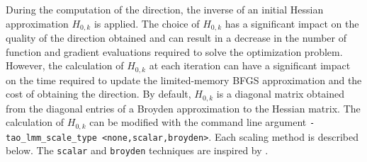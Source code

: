 During the computation of the direction, the inverse of an initial 
Hessian approximation $H_{0,k}$ is applied.  The choice of $H_{0,k}$
has a significant impact on the quality of the direction obtained
and can result in a decrease in the number of function and gradient 
evaluations required to solve the optimization problem.  However,
the calculation of $H_{0,k}$ at each iteration can have a significant 
impact on the time required to update the limited-memory BFGS 
approximation and the cost of obtaining the direction.  By default, 
$H_{0,k}$ is a diagonal matrix obtained from the diagonal entries
of a Broyden approximation to the Hessian matrix.  The calculation
of $H_{0,k}$ can be modified with the command line argument 
{\tt -tao\_lmm\_scale\_type <none,scalar,broyden>}.  Each scaling 
method is described below.  The {\tt scalar} and {\tt broyden} 
techniques are inspired by \cite{Gilbert-Lemarechal}.

